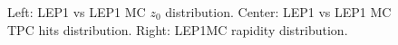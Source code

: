 \begin{figure}[H]
\centering
{}\hfill
{}\hfill %
\hfill %
\caption{Left: LEP1 vs LEP1 MC $z_0$ distribution. Center: LEP1 vs LEP1 MC TPC hits distribution. Right: LEP1MC rapidity distribution.}
\end{figure}


